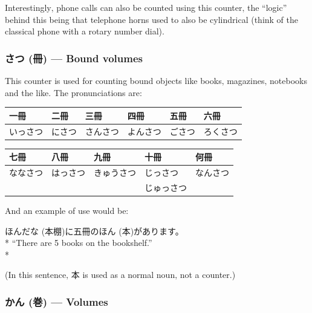 \documentclass[11pt, b5paper, twoside, openright, onecolumn]{book}
\makeatletter
\newcommand*{\rubystack}[2]{{\relscale{0.5}%
  \begin{tabular}[b]{@{}c@{}}%
    {#1}\\%
   {\textscale{2}{#2}}%
  \end{tabular}}%
}
\DeclareRobustCommand*{\ruby}[2]{%
  \mbox{%
    \setlength{\parskip}{0ex}%
    \BeginAccSupp{method=pdfstringdef,ActualText={#1}}%
      \rubystack{\phantom{#2}}{#1}%
      \llap{%
        \rubystack{#2}{\phantom{#1}}%
      }%
    \EndAccSupp{}%
  }%
}
\renewcommand*{\ruby}[2]{#2 (#1)}%
\newenvironment{exampleblock}{
\setlength{\parindent}{0.6in}
\begin{minipage}[t]{\dimexpr\textwidth-\parindent}}
{\end{minipage}}
\newenvironment{mytabular}[1]{\noindent\hspace{0.4in}
\begin{tabular}[h]{#1}}{\end{tabular}}
\makeatother
\begin{document}
Interestingly‚ phone calls can also be counted using this counter‚ the “logic” behind this being that telephone horns used to also be cylindrical (think of the classical phone with a rotary number dial).

\subsubsection{\ruby{冊}{さつ} — Bound volumes}

This counter is used for counting bound objects like books‚ magazines‚ notebooks and the like. The pronunciations are:

\vspace{0.5cm}
\smaller
\begin{mytabular}{| l  l  l  l  l  l |}\hline 
\rule{0pt}{2.4ex}一冊 & 二冊 & 三冊 & 四冊 & 五冊 & 六冊\\ 
\hline
\rule{0pt}{2.4ex}いっさつ & にさつ & さんさつ & よんさつ & ごさつ & ろくさつ\\ 
\hline 
\end{mytabular}
\larger
\vspace{0.5cm}

\smaller
\begin{mytabular}{| l  l  l  l  l |}\hline 
\rule{0pt}{2.4ex}七冊 & 八冊 & 九冊 & 十冊 & 何冊\\ 
\hline
\rule{0pt}{2.4ex}ななさつ & はっさつ & きゅうさつ & じっさつ & なんさつ\\ 
\rule{0pt}{2.4ex} &  &  & じゅっさつ & \\ 
\hline 
\end{mytabular}
\larger
\vspace{0.5cm}


And an example of use would be:

\vspace{0.4cm}
\begin{exampleblock}
\ruby{本棚}{ほんだな}に五冊の\ruby{本}{ほん}があります。 \\* 
“There are 5 books on the bookshelf.” \\* 
\end{exampleblock}
\vspace{0.2cm}

(In this sentence‚ 本 is used as a normal noun‚ not a counter.)

\subsubsection{\ruby{巻}{かん} — Volumes}
\end{document}
